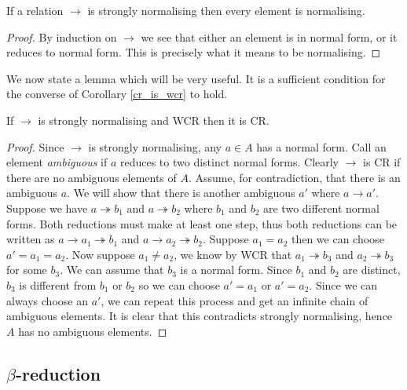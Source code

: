 \begin{cor}
    If a relation $\to$ is strongly normalising then every element is normalising.
\end{cor}

\begin{proof}
    By induction on $\to$ we see that either an element is in normal form, or it reduces to normal form. This is precisely what it means to be normalising.
\end{proof}

We now state a lemma which will be very useful. It is a sufficient condition for the converse of Corollary \ref{cr_is_wcr} to hold.

\begin{lemma}\label{newman}
    If $\to$ is strongly normalising and WCR then it is CR.
\end{lemma}

\begin{proof}
    Since $\to$ is strongly normalising, any $a \in A$ has a normal form. Call an element \emph{ambiguous} if $a$ reduces to two distinct normal forms. Clearly $\to$ is CR if there are no ambiguous elements of $A$.
    Assume, for contradiction, that there is an ambiguous $a$. We will show that there is another ambiguous $a'$ where $a \to a'$.
    Suppose we have $a \twoheadrightarrow b_1$ and $a \twoheadrightarrow b_2$ where $b_1$ and $b_2$ are two different normal forms. Both reductions must make at least one step, thus both reductions can be written as $a \to a_1 \twoheadrightarrow b_1$ and $a \to a_2 \twoheadrightarrow b_2$.
    Suppose $a_1 = a_2$ then we can choose $a' = a_1 = a_2$. Now suppose $a_1 \neq a_2$, we know by WCR that $a_1 \twoheadrightarrow b_3$ and $a_2 \twoheadrightarrow b_3$ for some $b_3$. We can assume that $b_3$ is a normal form. Since $b_1$ and $b_2$ are distinct, $b_3$ is different from $b_1$ or $b_2$ so we can choose $a' = a_1$ or $a'=a_2$.
    Since we can always choose an $a'$, we can repeat this process and get an infinite chain of ambiguous elements. It is clear that this contradicts strongly normalising, hence $A$ has no ambiguous elements.
\end{proof}






\subsection{$\beta$-reduction}

